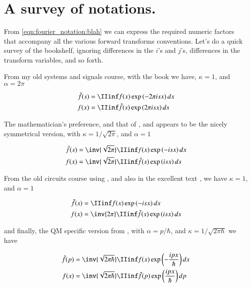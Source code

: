 \section{A survey of notations. }

From \ref{eqn:fourier_notation:blah} we can 
express the required numeric factors that accompany all the various forward transforms conventions.  Let's do a quick survey of the bookshelf, ignoring differences in the $i$'s and $j$'s, differences in the transform variables, and so forth.

From my old systems and signals course, with the book \citep{haykin1994cs} we have, $\kappa = 1$, and $\alpha = 2 \pi$

\begin{align*}
\tilde{f}(s) &= \IIinf f(x) \exp\left( - 2 \pi i s x \right) dx \\
f(x) &= \IIinf \tilde{f}(s) \exp\left( 2 \pi i s x \right) ds \\
\end{align*}

The mathematician's preference, and that of
\citep{bohm1989qt}, and \citep{byron1992mca} appears to be the nicely symmetrical version, with $\kappa = 1/\sqrt{2\pi}$, and $\alpha = 1$

\begin{align*}
\tilde{f}(s) &= \inv{\sqrt{2\pi}} \IIinf f(x) \exp\left( - i  s x \right) dx \\
f(x) &= \inv{\sqrt{2 \pi}} \IIinf \tilde{f}(s) \exp\left( i  s x \right) ds \\
\end{align*}

From the old circuits course using \citep{irwin2007bec}, and also in the excellent text \citep{lepage1980cva}, we have $\kappa = 1$, and $\alpha = 1$

\begin{align*}
\tilde{f}(s) &= \IIinf f(x) \exp\left( - i  s x \right) dx  \\
f(x) &= \inv{{2 \pi}} \IIinf \tilde{f}(s) \exp\left( i  s x \right) ds \\
\end{align*}

and finally, the QM specific version from \citep{mcmahon2005qmd}, with $\alpha = p/\hbar$, and $\kappa = 1/\sqrt{2\pi \hbar}$ we have

\begin{align*}
\tilde{f}(p) &= \inv{\sqrt{2\pi \hbar}} \IIinf f(x) \exp\left( - \frac{i  p x}{\hbar} \right) dx \\
f(x) &= \inv{\sqrt{2 \pi \hbar}} \IIinf \tilde{f}(p) \exp\left( \frac{i  p x}{\hbar} \right) dp \\
\end{align*}
